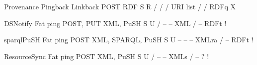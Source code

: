                                             
                                                Provenance Pingback
                                                Linkback
                                                POST
                                                RDF
                                                S R
                                                /
                                                /
                                                /
                                                URI list
                                                /
                                                /
                                                RDFq
                                                X
                                            
                                            
                                                DSNotify
                                                Fat ping
                                                POST, PUT
                                                XML, PuSH
                                                S U
                                                /
                                                –
                                                –
                                                XML
                                                /
                                                –
                                                RDFt
                                                !
                                            
                                            
                                                sparqlPuSH
                                                Fat ping
                                                POST
                                                XML, SPARQL, PuSH
                                                S U
                                                –
                                                –
                                                –
                                                XMLra
                                                /
                                                –
                                                RDFt
                                                !
                                            
                                            
                                                ResourceSync
                                                Fat ping
                                                POST
                                                XML, PuSH
                                                S U
                                                /
                                                –
                                                –
                                                XMLs
                                                /
                                                –
                                                ?
                                                !
                                            
